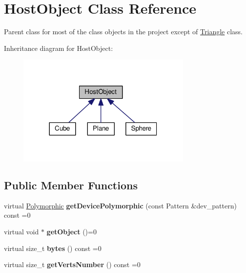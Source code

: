 \hypertarget{class_host_object}{}\section{Host\+Object Class Reference}
\label{class_host_object}


Parent class for most of the class objects in the project except of \hyperlink{class_triangle}{Triangle} class.  




Inheritance diagram for Host\+Object\+:
\nopagebreak
\begin{figure}[H]
\begin{center}
\leavevmode
\includegraphics[width=245pt]{class_host_object__inherit__graph}
\end{center}
\end{figure}
\subsection*{Public Member Functions}
\begin{DoxyCompactItemize}
\item 
virtual \hyperlink{struct_polymorphic}{Polymorphic} {\bfseries get\+Device\+Polymorphic} (const Pattern \&dev\+\_\+pattern) const =0\hypertarget{class_host_object_a41171fd7c423b8b766d06f55fa4be867}{}\label{class_host_object_a41171fd7c423b8b766d06f55fa4be867}

\item 
virtual void $\ast$ {\bfseries get\+Object} ()=0\hypertarget{class_host_object_a32c392f12e133d9ecfce76a2e5135c94}{}\label{class_host_object_a32c392f12e133d9ecfce76a2e5135c94}

\item 
virtual size\+\_\+t {\bfseries bytes} () const =0\hypertarget{class_host_object_aacb8c44633ea4411d0972f933870557e}{}\label{class_host_object_aacb8c44633ea4411d0972f933870557e}

\item 
virtual size\+\_\+t {\bfseries get\+Verts\+Number} () const =0\hypertarget{class_host_object_a0d6005a4895a5246deae24daf2c71ca7}{}\label{class_host_object_a0d6005a4895a5246deae24daf2c71ca7}

\end{DoxyCompactItemize}


